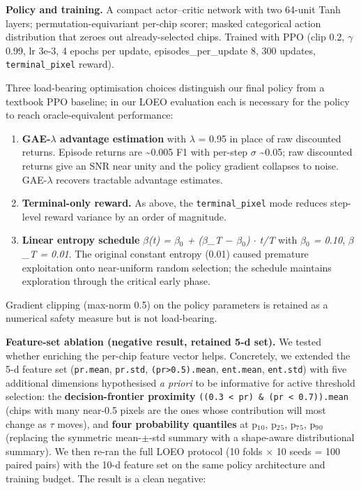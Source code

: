 \textbf{Policy and training.} A compact actor--critic network with two 64-unit
Tanh layers; permutation-equivariant per-chip scorer; masked categorical
action distribution that zeroes out already-selected chips. Trained with
PPO \cite{schulman2017ppo} (clip 0.2, $\gamma$ 0.99, lr 3e-3, 4 epochs per update,
episodes\_per\_update 8, 300 updates, \texttt{terminal\_pixel} reward).

Three load-bearing optimisation choices distinguish our final policy from
a textbook PPO baseline; in our LOEO evaluation each is necessary for the
policy to reach oracle-equivalent performance:

\begin{enumerate}
\def\labelenumi{\arabic{enumi}.}
\tightlist
\item
  \textbf{GAE-$\lambda$ advantage estimation} with $\lambda$ = 0.95 in place of raw discounted
  returns. Episode returns are \textasciitilde0.005 F1 with per-step $\sigma$ \textasciitilde0.05; raw
  discounted returns give an SNR near unity and the policy gradient
  collapses to noise. GAE-$\lambda$ recovers tractable advantage estimates.
\item
  \textbf{Terminal-only reward.} As above, the \texttt{terminal\_pixel} mode reduces
  step-level reward variance by an order of magnitude.
\item
  \textbf{Linear entropy schedule} \emph{$\beta$(t) = $\beta$$_{0}$ + ($\beta$\_T $-$ $\beta$$_{0}$) $\cdot$ t/T} with
  \emph{$\beta$$_{0}$ = 0.10}, \emph{$\beta$\_T = 0.01}. The original constant entropy (0.01) caused
  premature exploitation onto near-uniform random selection; the schedule
  maintains exploration through the critical early phase.
\end{enumerate}

Gradient clipping (max-norm 0.5) on the policy parameters is retained as a
numerical safety measure but is not load-bearing.

\textbf{Feature-set ablation (negative result, retained 5-d set).} We tested
whether enriching the per-chip feature vector helps. Concretely, we
extended the 5-d feature set (\texttt{pr.mean}, \texttt{pr.std}, \texttt{(pr\textgreater{}0.5).mean},
\texttt{ent.mean}, \texttt{ent.std}) with five additional dimensions hypothesised \emph{a
priori} to be informative for active threshold selection: the
\textbf{decision-frontier proximity} \texttt{((0.3\ \textless{}\ pr)\ \&\ (pr\ \textless{}\ 0.7)).mean} (chips
with many near-0.5 pixels are the ones whose contribution will most
change as $\tau$ moves), and \textbf{four probability quantiles} at p$_{1}$$_{0}$, p$_{2}$$_{5}$, p$_{7}$$_{5}$,
p$_{9}$$_{0}$ (replacing the symmetric mean-$\pm$-std summary with a shape-aware
distributional summary). We then re-ran the full LOEO protocol (10
folds $\times$ 10 seeds = 100 paired pairs) with the 10-d feature set on the
same policy architecture and training budget. The result is a clean
negative:

